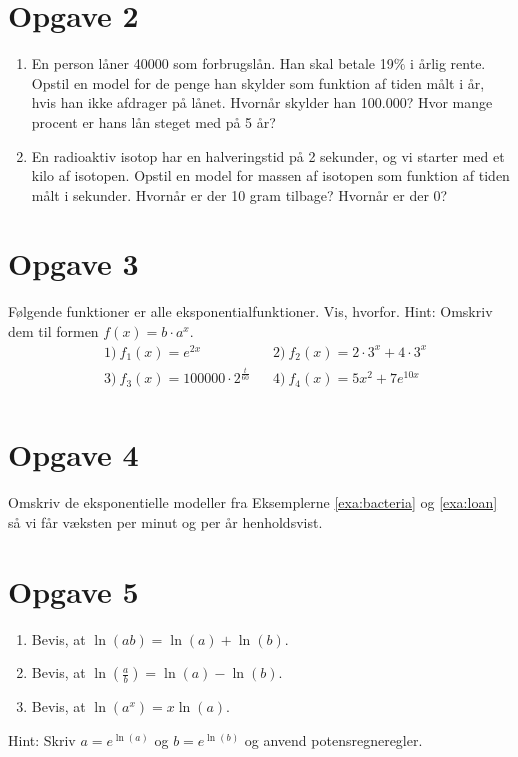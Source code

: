 \section*{Opgave 2}
\begin{enumerate}[label=\roman*)]
\item En person låner 40000 som forbrugslån. Han skal betale 19$\%$ i årlig rente. Opstil en model for de penge han skylder som funktion af tiden målt i år, hvis han ikke afdrager på lånet. Hvornår skylder han 100.000? Hvor mange procent er hans lån steget med på 5 år?
\item En radioaktiv isotop har en halveringstid på 2 sekunder, og vi starter med et kilo af isotopen. Opstil en model for massen af isotopen som funktion af tiden målt i sekunder. Hvornår er der 10 gram tilbage? Hvornår er der 0?
\end{enumerate}

\section*{Opgave 3}
Følgende funktioner er alle eksponentialfunktioner. Vis, hvorfor. Hint: Omskriv dem til formen $f(x) = b\cdot a^x$. 
\begin{align*}
&1) \ f_1(x) = e^{2x}    &&2) \  f_2(x) = 2\cdot 3^x + 4\cdot 3^x  \\
&3) \ f_3(x) =  100000\cdot 2^{\frac{t}{60}}  &&4) \ f_4(x) = 5x^2 +7e^{10x}    \\
\end{align*}

\section*{Opgave 4}
Omskriv de eksponentielle modeller fra Eksemplerne \ref{exa:bacteria} og \ref{exa:loan} så vi får væksten per minut og per år henholdsvist.

\section*{Opgave 5}
\begin{enumerate}[label=\roman*)]
\item Bevis, at  $\ln(ab) = \ln(a)+\ln(b).$
\item Bevis, at  $\ln(\frac{a}{b}) = \ln(a)-\ln(b)$.
\item Bevis, at  $\ln(a^x) = x\ln(a)$.
\end{enumerate}
Hint: Skriv $a = e^{\ln(a)}$ og $b=e^{\ln(b)}$ og anvend potensregneregler. 
